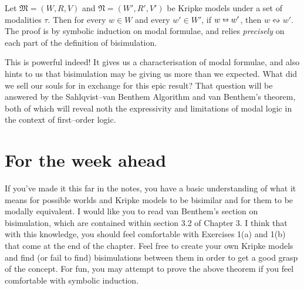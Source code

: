 \bigskip

Let $\mathfrak{M}=(W, R, V)$ and $\mathfrak{N} = (W', R', V')$ be Kripke models under a set of modalities $\tau$. Then for every $w
\in W$ and every $w' \in W'$, if $w \leftrightarroweq w'$, then $w \leftrightsquigarrow w'$. The proof is by symbolic
induction on modal formulae, and relies \emph{precisely} on each part of the definition of bisimulation.

\bigskip

This is powerful indeed! It gives us a characterisation of modal formulae, and also hints to us that bisimulation may
be giving us more than we expected. What did we sell our souls for in exchange for this epic result? That question will be
answered by the Sahlqvist--van Benthem Algorithm and van Benthem's theorem, both of which will reveal noth the expressivity and 
limitations of modal logic in the context of first--order logic.

\section{For the week ahead}
If you've made it this far in the notes, you have a basic understanding of what it means for possible worlds and Kripke
models to be bisimilar and for them to be modally equivalent. I would like you to read van Benthem's section on bisimulation,
which are contained within section 3.2 of Chapter 3. I think that with this knowledge, you should feel comfortable with
Exercises 1(a) and 1(b) that come at the end of the chapter. Feel free to create your own Kripke models and find (or fail to find)
bisimulations between them in order to get a good grasp of the concept. For fun, you may attempt to prove the above theorem
if you feel comfortable with symbolic induction.